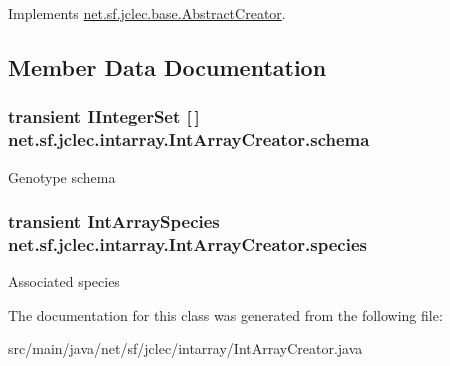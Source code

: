 Implements \hyperlink{classnet_1_1sf_1_1jclec_1_1base_1_1_abstract_creator_a75beaef8489c52782e0c7c956c2beaf7}{net.\-sf.\-jclec.\-base.\-Abstract\-Creator}.



\subsection{Member Data Documentation}
\hypertarget{classnet_1_1sf_1_1jclec_1_1intarray_1_1_int_array_creator_af2696a00d19060a87f7a2a0f3de5eb18}{
\subsubsection[{schema}]{\setlength{\rightskip}{0pt plus 5cm}transient {\bf I\-Integer\-Set} \mbox{[}$\,$\mbox{]} net.\-sf.\-jclec.\-intarray.\-Int\-Array\-Creator.\-schema\hspace{0.3cm}{\ttfamily [protected]}}}\label{classnet_1_1sf_1_1jclec_1_1intarray_1_1_int_array_creator_af2696a00d19060a87f7a2a0f3de5eb18}
Genotype schema \hypertarget{classnet_1_1sf_1_1jclec_1_1intarray_1_1_int_array_creator_a72bbe92f5a92a82d3849c9e302a14d5e}{
\subsubsection[{species}]{\setlength{\rightskip}{0pt plus 5cm}transient {\bf Int\-Array\-Species} net.\-sf.\-jclec.\-intarray.\-Int\-Array\-Creator.\-species\hspace{0.3cm}{\ttfamily [protected]}}}\label{classnet_1_1sf_1_1jclec_1_1intarray_1_1_int_array_creator_a72bbe92f5a92a82d3849c9e302a14d5e}
Associated species 

The documentation for this class was generated from the following file\-:\begin{DoxyCompactItemize}
\item 
src/main/java/net/sf/jclec/intarray/Int\-Array\-Creator.\-java\end{DoxyCompactItemize}
